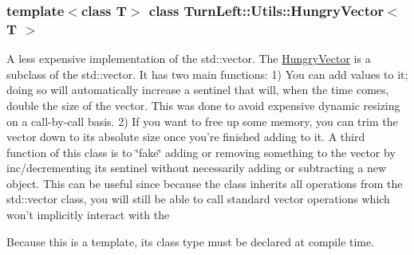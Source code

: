\subsubsection*{template$<$class T$>$ class TurnLeft::Utils::HungryVector$<$ T $>$}

A less expensive implementation of the std::vector. The \hyperlink{classTurnLeft_1_1Utils_1_1HungryVector}{HungryVector} is a subclass of the std::vector. It has two main functions: 1) You can add values to it; doing so will automatically increase a sentinel that will, when the time comes, double the size of the vector. This was done to avoid expensive dynamic resizing on a call-\/by-\/call basis. 2) If you want to free up some memory, you can trim the vector down to its absolute size once you're finished adding to it. A third function of this class is to \char`\"{}fake\char`\"{} adding or removing something to the vector by inc/decrementing its sentinel without necessarily adding or subtracting a new object. This can be useful since because the class inherits all operations from the std::vector class, you will still be able to call standard vector operations which won't implicitly interact with the

Because this is a template, its class type must be declared at compile time. 

